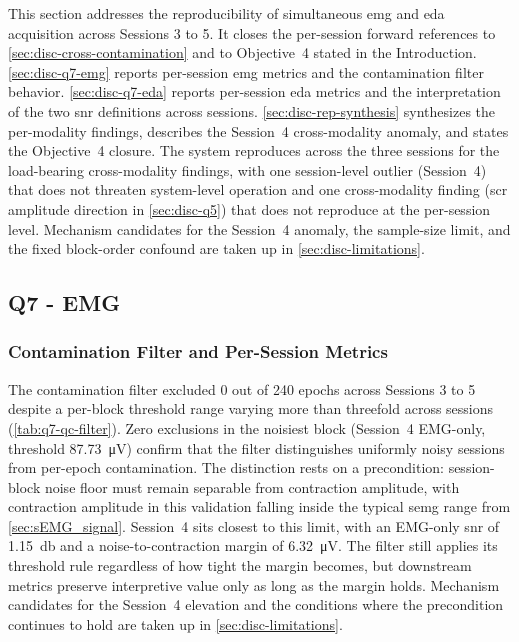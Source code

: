 This section addresses the reproducibility of simultaneous \gls{emg} and \gls{eda} acquisition across Sessions 3 to 5. It closes the per-session forward references to \autoref{sec:disc-cross-contamination} and to Objective~4 stated in the Introduction. \autoref{sec:disc-q7-emg} reports per-session \gls{emg} metrics and the contamination filter behavior. \autoref{sec:disc-q7-eda} reports per-session \gls{eda} metrics and the interpretation of the two \gls{snr} definitions across sessions. \autoref{sec:disc-rep-synthesis} synthesizes the per-modality findings, describes the Session~4 cross-modality anomaly, and states the Objective~4 closure. The system reproduces across the three sessions for the load-bearing cross-modality findings, with one session-level outlier (Session~4) that does not threaten system-level operation and one cross-modality finding (\gls{scr} amplitude direction in \autoref{sec:disc-q5}) that does not reproduce at the per-session level. Mechanism candidates for the Session~4 anomaly, the sample-size limit, and the fixed block-order confound are taken up in \autoref{sec:disc-limitations}.


\subsection{Q7 - EMG}
\label{sec:disc-q7-emg}

\subsubsection{Contamination Filter and Per-Session Metrics}
\label{sec:disc-q7-emg-metrics}

The contamination filter excluded 0 out of 240 epochs across Sessions 3 to 5 despite a per-block threshold range varying more than threefold across sessions (\autoref{tab:q7-qc-filter}). Zero exclusions in the noisiest block (Session~4 EMG-only, threshold \SI{87.73}{\micro\volt}) confirm that the filter distinguishes uniformly noisy sessions from per-epoch contamination. The distinction rests on a precondition: session-block noise floor must remain separable from contraction amplitude, with contraction amplitude in this validation falling inside the typical \gls{semg} range from \autoref{sec:sEMG_signal}. Session~4 sits closest to this limit, with an EMG-only \gls{snr} of \SI{1.15}{\decibel} and a noise-to-contraction margin of \SI{6.32}{\micro\volt}. The filter still applies its threshold rule regardless of how tight the margin becomes, but downstream metrics preserve interpretive value only as long as the margin holds. Mechanism candidates for the Session~4 elevation and the conditions where the precondition continues to hold are taken up in \autoref{sec:disc-limitations}.

